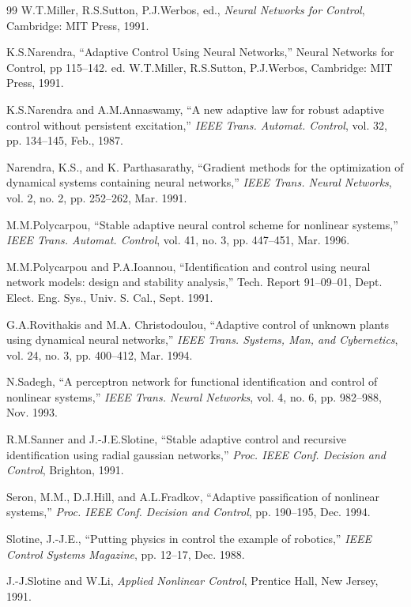 \documentclass[12pt,a4paper]{ctexart}
\begin{document}
\begin{thebibliography}{99}
 W.T.Miller, R.S.Sutton, P.J.Werbos, ed., \textit{Neural Networks for Control}, Cambridge: MIT Press, 1991.

 K.S.Narendra, ``Adaptive Control Using Neural Networks,'' Neural Networks for Control, pp 115--142. ed. W.T.Miller, R.S.Sutton, P.J.Werbos, Cambridge: MIT Press, 1991.

 K.S.Narendra and A.M.Annaswamy, ``A new adaptive law for robust adaptive control without persistent excitation,'' \textit{IEEE Trans. Automat. Control}, vol. 32, pp. 134--145, Feb., 1987.

 Narendra, K.S., and K. Parthasarathy, ``Gradient methods for the optimization of dynamical systems containing neural networks,'' \textit{IEEE Trans. Neural Networks}, vol. 2, no. 2, pp. 252--262, Mar. 1991.

 M.M.Polycarpou, ``Stable adaptive neural control scheme for nonlinear systems,'' \textit{IEEE Trans. Automat. Control}, vol. 41, no. 3, pp. 447--451, Mar. 1996.

 M.M.Polycarpou and P.A.Ioannou, ``Identification and control using neural network models: design and stability analysis,'' Tech. Report 91--09--01, Dept. Elect. Eng. Sys., Univ. S. Cal., Sept. 1991.

 G.A.Rovithakis and M.A. Christodoulou, ``Adaptive control of unknown plants using dynamical neural networks,'' \textit{IEEE Trans. Systems, Man, and Cybernetics}, vol. 24, no. 3, pp. 400--412, Mar. 1994.

 N.Sadegh, ``A perceptron network for functional identification and control of nonlinear systems,'' \textit{IEEE Trans. Neural Networks}, vol. 4, no. 6, pp. 982--988, Nov. 1993.

 R.M.Sanner and J.-J.E.Slotine, ``Stable adaptive control and recursive identification using radial gaussian networks,'' \textit{Proc. IEEE Conf. Decision and Control}, Brighton, 1991.

 Seron, M.M., D.J.Hill, and A.L.Fradkov, ``Adaptive passification of nonlinear systems,'' \textit{Proc. IEEE Conf. Decision and Control}, pp. 190--195, Dec. 1994.

 Slotine, J.-J.E., ``Putting physics in control the example of robotics,'' \textit{IEEE Control Systems Magazine}, pp. 12--17, Dec. 1988.

 J.-J.Slotine and W.Li, \textit{Applied Nonlinear Control}, Prentice Hall, New Jersey, 1991.


\end{thebibliography}
\end{document}
